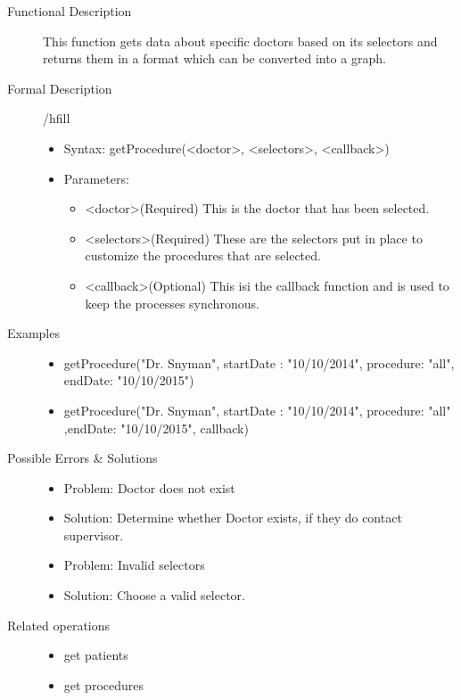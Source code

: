 \documentclass[a4paper]{article}
\begin{document}
\begin{description}
\item[Functional Description] This function gets data about specific doctors based on its selectors and returns them in a format which can be converted into a graph.
\item[Formal Description]/hfill
\begin{itemize}
	\item Syntax: getProcedure(<doctor>, <selectors>, <callback>)\\
	\item Parameters:
		\begin{itemize}
			\item <doctor>(Required) This is the doctor that has been selected.
			\item <selectors>(Required) These are the selectors put in place to customize the procedures that are selected.
			\item <callback>(Optional) This isi the callback function and is used to keep the processes synchronous.
		\end{itemize}
\end{itemize}
\item[Examples]\hfill
\begin{itemize}
	\item getProcedure("Dr. Snyman", {startDate : "10/10/2014", procedure: "all", endDate: "10/10/2015"})
	\item getProcedure("Dr. Snyman", {startDate : "10/10/2014", procedure: "all" ,endDate: "10/10/2015"}, callback)
\end{itemize}
\item[Possible Errors \& Solutions]
\begin{itemize}
	\item Problem: Doctor does not exist
	\item Solution: Determine whether Doctor exists, if they do contact supervisor.
	\item Problem: Invalid selectors
	\item Solution: Choose a valid selector.
\end{itemize}
\item[Related operations] \hfill
\begin{itemize}
	\item get patients
	\item get procedures
\end{itemize}
\end{description}
\end{document}
